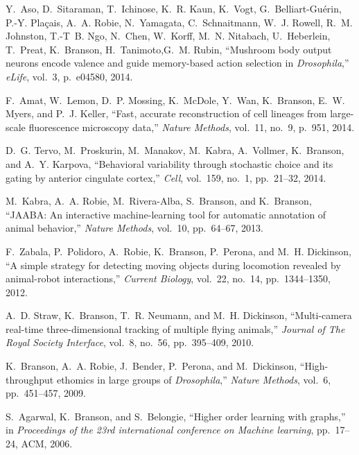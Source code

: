 \begin{cvenum}
  \item Y.~Aso, D.~Sitaraman, T.~Ichinose, K.~R. Kaun, K.~Vogt, G.~Belliart-Gu{\'e}rin, P.-Y. Pla{\c{c}}ais, A.~A. Robie, N.~Yamagata, C.~Schnaitmann, W.~J. Rowell, R.~M. Johnston, T.-T~B. Ngo, N.~Chen, W.~Korff, M.~N. Nitabach, U.~Heberlein, T.~Preat, K.~Branson, H.~Tanimoto,G.~M. Rubin,  ``Mushroom body output neurons encode valence and guide memory-based action selection in {\em {{D}}rosophila},'' {\em eLife}, vol.~3, p.~e04580, 2014.

\item F.~Amat, W.~Lemon, D.~P. Mossing, K.~McDole, Y.~Wan, K.~Branson, E.~W. Myers,
  and P.~J. Keller, ``Fast, accurate reconstruction of cell lineages from
  large-scale fluorescence microscopy data,'' {\em Nature Methods}, vol.~11,
  no.~9, p.~951, 2014.

\item D.~G. Tervo, M.~Proskurin, M.~Manakov, M.~Kabra, A.~Vollmer, K.~Branson, and
  A.~Y. Karpova, ``Behavioral variability through stochastic choice and its
  gating by anterior cingulate cortex,'' {\em Cell}, vol.~159, no.~1,
  pp.~21--32, 2014.
  
\item M.~Kabra, A.~A. Robie, M.~Rivera-Alba, S.~Branson, and K.~Branson, ``{{JAABA}}:
  An interactive machine-learning tool for automatic annotation of animal
  behavior,'' {\em Nature Methods}, vol.~10, pp.~64--67, 2013.

\item F.~Zabala, P.~Polidoro, A.~Robie, K.~Branson, P.~Perona, and M.~H. Dickinson,
  ``A simple strategy for detecting moving objects during locomotion revealed
  by animal-robot interactions,'' {\em Current Biology}, vol.~22, no.~14,
  pp.~1344--1350, 2012.

\item A.~D. Straw, K.~Branson, T.~R. Neumann, and M.~H. Dickinson, ``Multi-camera
  real-time three-dimensional tracking of multiple flying animals,'' {\em
  Journal of The Royal Society Interface}, vol.~8, no.~56, pp.~395--409, 2010.

\item K.~Branson, A.~A. Robie, J.~Bender, P.~Perona, and M.~Dickinson,
  ``High-throughput ethomics in large groups of \emph{{D}rosophila},'' {\em
  Nature Methods}, vol.~6, pp.~451--457, 2009.

\item S.~Agarwal, K.~Branson, and S.~Belongie, ``Higher order learning with graphs,''
  in {\em Proceedings of the 23rd international conference on Machine
  learning}, pp.~17--24, ACM, 2006.


\end{cvenum}
